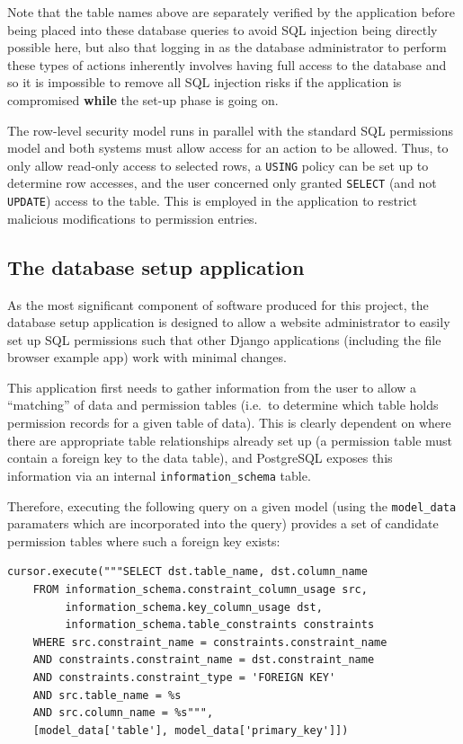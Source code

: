\documentclass{article}
\begin{document}
Note that the table names above are separately verified by the application before being placed into these database queries to avoid SQL injection being directly possible here, but also that logging in as the database administrator to perform these types of actions inherently involves having full access to the database and so it is impossible to remove all SQL injection risks if the application is compromised \textbf{while} the set-up phase is going on.

The row-level security model runs in parallel with the standard SQL permissions model and both systems must allow access for an action to be allowed. Thus, to only allow read-only access to selected rows, a \texttt{USING} policy can be set up to determine row accesses, and the user concerned only granted \texttt{SELECT} (and not \texttt{UPDATE}) access to the table. This is employed in the application to restrict malicious modifications to permission entries.

\subsection{The database setup application}
As the most significant component of software produced for this project, the database setup application is designed to allow a website administrator to easily set up SQL permissions such that other Django applications (including the file browser example app) work with minimal changes.

This application first needs to gather information from the user to allow a ``matching'' of data and permission tables (i.e.\ to determine which table holds permission records for a given table of data). This is clearly dependent on where there are appropriate table relationships already set up (a permission table must contain a foreign key to the data table), and PostgreSQL exposes this information via an internal \verb+information_schema+ table.

Therefore, executing the following query on a given model (using the \verb+model_data+ paramaters which are incorporated into the query) provides a set of candidate permission tables where such a foreign key exists:

\begin{verbatim}
cursor.execute("""SELECT dst.table_name, dst.column_name
    FROM information_schema.constraint_column_usage src,
         information_schema.key_column_usage dst,
         information_schema.table_constraints constraints
    WHERE src.constraint_name = constraints.constraint_name
    AND constraints.constraint_name = dst.constraint_name
    AND constraints.constraint_type = 'FOREIGN KEY'
    AND src.table_name = %s
    AND src.column_name = %s""",
    [model_data['table'], model_data['primary_key']])
\end{verbatim}
\end{document}
